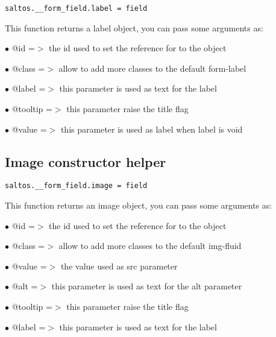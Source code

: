 \documentclass[a4paper]{book}
\begin{document}
\begin{lstlisting}
saltos.__form_field.label = field
\end{lstlisting}

This function returns a label object, you can pass some arguments as:

\begin{compactitem}
\item[\color{myblue}$\bullet$] @id      =$>$ the id used to set the reference for to the object
\item[\color{myblue}$\bullet$] @class   =$>$ allow to add more classes to the default form-label
\item[\color{myblue}$\bullet$] @label   =$>$ this parameter is used as text for the label
\item[\color{myblue}$\bullet$] @tooltip =$>$ this parameter raise the title flag
\item[\color{myblue}$\bullet$] @value   =$>$ this parameter is used as label when label is void
\end{compactitem}

\hypertarget{toc395}{}
\subsection{Image constructor helper}

\begin{lstlisting}
saltos.__form_field.image = field
\end{lstlisting}

This function returns an image object, you can pass some arguments as:

\begin{compactitem}
\item[\color{myblue}$\bullet$] @id      =$>$ the id used to set the reference for to the object
\item[\color{myblue}$\bullet$] @class   =$>$ allow to add more classes to the default img-fluid
\item[\color{myblue}$\bullet$] @value   =$>$ the value used as src parameter
\item[\color{myblue}$\bullet$] @alt     =$>$ this parameter is used as text for the alt parameter
\item[\color{myblue}$\bullet$] @tooltip =$>$ this parameter raise the title flag
\item[\color{myblue}$\bullet$] @label   =$>$ this parameter is used as text for the label
\end{compactitem}
\end{document}
